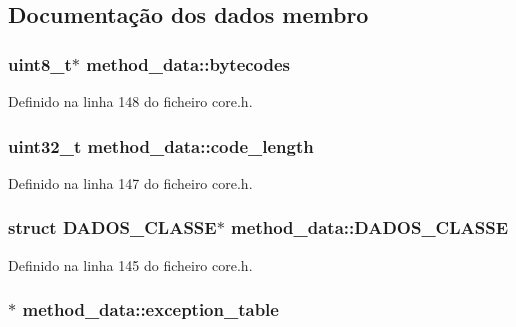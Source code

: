 \subsection{Documentação dos dados membro}
\hypertarget{structmethod__data_a602f386ab76983d72ba48488f8c309a9}{
\subsubsection[{bytecodes}]{\setlength{\rightskip}{0pt plus 5cm}uint8\-\_\-t$\ast$ method\-\_\-data\-::bytecodes}}\label{structmethod__data_a602f386ab76983d72ba48488f8c309a9}


Definido na linha 148 do ficheiro core.\-h.

\hypertarget{structmethod__data_a9c6035e8b389eea9bc15f380cffefe8b}{
\subsubsection[{code\-\_\-length}]{\setlength{\rightskip}{0pt plus 5cm}uint32\-\_\-t method\-\_\-data\-::code\-\_\-length}}\label{structmethod__data_a9c6035e8b389eea9bc15f380cffefe8b}


Definido na linha 147 do ficheiro core.\-h.

\hypertarget{structmethod__data_a2a372a889aabaea0e0b4a08be11cbfa3}{
\subsubsection[{D\-A\-D\-O\-S\-\_\-\-C\-L\-A\-S\-S\-E}]{\setlength{\rightskip}{0pt plus 5cm}struct {\bf D\-A\-D\-O\-S\-\_\-\-C\-L\-A\-S\-S\-E}$\ast$ method\-\_\-data\-::\-D\-A\-D\-O\-S\-\_\-\-C\-L\-A\-S\-S\-E}}\label{structmethod__data_a2a372a889aabaea0e0b4a08be11cbfa3}


Definido na linha 145 do ficheiro core.\-h.

\hypertarget{structmethod__data_ad9179cc8edbe4688c2f97359cc05ccd0}{
\subsubsection[{exception\-\_\-table}]{$\ast$ method\-\_\-data\-::exception\-\_\-table}}\label{structmethod__data_ad9179cc8edbe4688c2f97359cc05ccd0}


